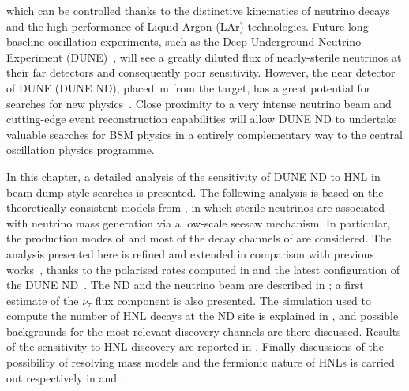 which can be controlled thanks to the distinctive kinematics of neutrino decays and %
the high performance of Liquid Argon (LAr) technologies.
Future long baseline oscillation experiments, such as the Deep Underground Neutrino Experiment %
(DUNE)~\cite{Abi:2018dnh}, will see a greatly diluted flux of nearly-sterile neutrinos %
at their far detectors and consequently poor sensitivity.
However, the near detector of DUNE (DUNE ND), placed \,m from the target, has a great potential %
for searches for new physics~\cite{Adams:2013qkq}.
Close proximity to a very intense neutrino beam and cutting-edge event reconstruction capabilities %
will allow DUNE ND to undertake valuable searches for BSM physics in a entirely complementary way %
to the central oscillation physics programme. 

In this chapter, a detailed analysis of the sensitivity of DUNE ND to HNL in beam-dump-style searches is presented.
The following analysis is based on the theoretically consistent models from , %
in which sterile neutrinos are associated with neutrino mass generation via a low-scale seesaw mechanism.
In particular, the production modes of  and most of the decay channels of  %
are considered.
The analysis presented here is refined and extended in comparison with previous works~\cite{Krasnov:2019kdc, Adams:2013qkq}, %
thanks to the polarised rates computed in  and the latest configuration of the DUNE ND~\cite{Abi:2020wmh}.
The ND and the neutrino beam are described in ; %
a first estimate of the $\nu_\tau$ flux component is also presented.
The simulation used to compute the number of HNL decays at the ND site is explained in , %
and possible backgrounds for the most relevant discovery channels are there discussed.
Results of the sensitivity to HNL discovery are reported in .
Finally discussions of the possibility of resolving mass models and the fermionic nature of HNLs is %
carried out respectively in  and .


